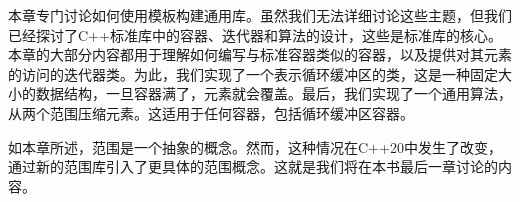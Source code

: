 本章专门讨论如何使用模板构建通用库。虽然我们无法详细讨论这些主题，但我们已经探讨了C++标准库中的容器、迭代器和算法的设计，这些是标准库的核心。本章的大部分内容都用于理解如何编写与标准容器类似的容器，以及提供对其元素的访问的迭代器类。为此，我们实现了一个表示循环缓冲区的类，这是一种固定大小的数据结构，一旦容器满了，元素就会覆盖。最后，我们实现了一个通用算法，从两个范围压缩元素。这适用于任何容器，包括循环缓冲区容器。

如本章所述，范围是一个抽象的概念。然而，这种情况在C++20中发生了改变，通过新的范围库引入了更具体的范围概念。这就是我们将在本书最后一章讨论的内容。